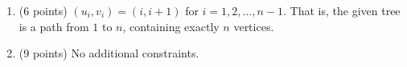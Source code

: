 \begin{enumerate}
    \tightlist
    \item (6 points) $(u_i, v_i) = (i, i + 1)$ for $i = 1, 2, \ldots, n - 1$.
    That is, the given tree is a path from $1$ to $n$, containing exactly $n$ vertices.
    \item (9 points) No additional constraints.
\end{enumerate}
    